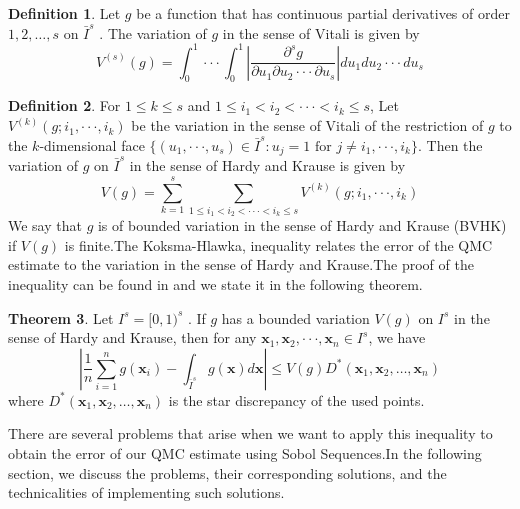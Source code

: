 \documentclass{article}
\theoremstyle{definition}
\newtheorem{definition}{Definition}[section]
\newtheorem{theorem}[definition]{Theorem}
\begin{document}
\begin{definition}
    Let $g$ be a function that has continuous partial derivatives of order $1,2,\ldots, s$ on $\bar{I}^{s}$ . The variation of $g$ in the sense of Vitali is given by \begin{equation}
    V^{(s)}(g)=\int_0^1 \cdot\cdot\cdot\int_0^1 \left\lvert \frac{\partial^{s}g}{\partial u_1 \partial u_2\cdot\cdot\cdot\partial u_s}\right\rvert du_1du_2\cdot\cdot\cdot du_s
    \end{equation}
\end{definition}

\begin{definition}
 For $1\leq k\leq s$ and $1\leq i_1 <i_2<\cdot\cdot\cdot< i_k\leq s$, Let $V^{(k)}(g;i_1,\cdot\cdot\cdot,i_k)$ be the variation in the sense of Vitali of the restriction of $g$ to the $k$-dimensional face $\{(u_1,\cdot\cdot\cdot,u_s)\in \bar{I}^{s}: u_j=1 \text{ for } j\neq i_1,\cdot\cdot\cdot, i_k\}$. Then the variation of $g$ on $\bar{I}^s$ in the sense of Hardy and Krause is given by \begin{equation}\label{Variation in the sense of Hardy and Krause}
     V(g)=\sum_{k=1}^s \sum_{1\leq i_1 <i_2<\cdot\cdot\cdot< i_k\leq s}V^{(k)}(g;i_1,\cdot\cdot\cdot,i_k)
 \end{equation}  We say that $g$ is of
 bounded variation in the sense of Hardy and Krause (BVHK) if $V(g)$ is finite.The Koksma-Hlawka, inequality relates the error of the QMC estimate to the variation in the sense of Hardy and Krause.The proof of the inequality can be found in  \cite{alma991015801878809621} and we state it in the following theorem. 
 \end{definition}

\begin{theorem}
\label{th:KH}
Let ${I}^{s}=[0,1)^s$ . If $g$ has a bounded variation $V(g)$ on ${I}^{s}$ in the sense of Hardy and Krause, then for any $\mathbf{x}_1,\mathbf{x}_2,\cdot\cdot\cdot,\mathbf{x}_n\in I^s$, we have
    \begin{equation}\label{Koksma Hlawka Inequality}
    \left\lvert \frac{1}{n}\sum_{i=1}^ng(\mathbf{x}_i) -\int_{\bar{I}^s} g(\mathbf{x})d\mathbf{x}  \right\rvert\leq V(g)D^{\ast}(\mathbf{x}_1,\mathbf{x}_2,\ldots,\mathbf{x}_n)
    \end{equation}
where $D^{\ast}(\mathbf{x}_1,\mathbf{x}_2,\ldots,\mathbf{x}_n)$ is the star discrepancy of the used points.
\end{theorem}
 
 \noindent There are several problems that arise when we want to apply this inequality to obtain the error of our QMC estimate using Sobol Sequences.In the following section, we discuss the problems, their corresponding solutions, and the technicalities of implementing such solutions.
\end{document}
